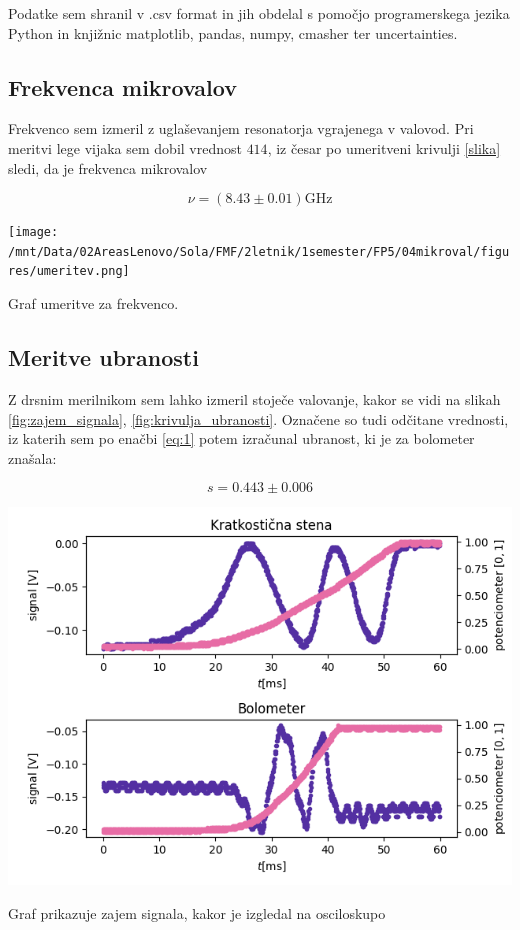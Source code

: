 \documentclass[11pt]{article}
\begin{document}
Podatke sem shranil v .csv format in jih obdelal s pomočjo programerskega
jezika Python in knjižnic matplotlib, pandas, numpy, cmasher ter
uncertainties.
\subsection{Frekvenca mikrovalov}\label{sec:orgb9f4d6a}

Frekvenco sem izmeril z uglaševanjem resonatorja vgrajenega v valovod. Pri
meritvi lege vijaka sem dobil vrednost \(414\), iz česar po umeritveni
krivulji \ref{slika} sledi, da je frekvenca mikrovalov

\[ \nu = (8.43 \pm 0.01) \mathrm{GHz}
\]

\begin{slika}[H]
\begin{center}
\texttt{[image: /mnt/Data/02AreasLenovo/Sola/FMF/2letnik/1semester/FP5/04mikroval/figures/umeritev.png]}
\end{center}
\caption{\small Graf umeritve za frekvenco. }\label{fig:umeritev}
\end{slika}


\subsection{Meritve ubranosti}\label{sec:org4464617}

Z drsnim merilnikom sem lahko izmeril stoječe valovanje, kakor se vidi na
slikah \ref{fig:zajem_signala}, \ref{fig:krivulja_ubranosti}. Označene so tudi
odčitane vrednosti, iz
katerih sem po enačbi \ref{eq:1} potem izračunal ubranost, ki je za bolometer
znašala:

\[s = 0.443 \pm 0.006
\]

\begin{slika}[H]
\begin{center}
\includegraphics[width=.9\linewidth]{figures/kratkoInBolo}
\end{center}
\caption{\small Graf prikazuje zajem signala, kakor je izgledal na osciloskupo}\label{fig:zajem_signala}
\end{slika}
\end{document}
